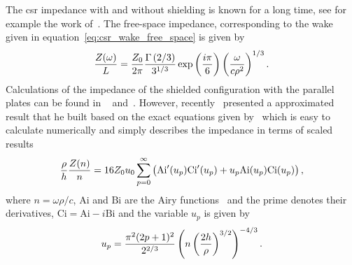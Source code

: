     The \gls{csr} impedance with and without shielding is known for a long time, see for example the work of~. The free-space impedance, corresponding to the wake given in equation~\eqref{eq:csr_wake_free_space} is given by~\cite[Eq. 18]{Nagaoka2014}
    \begin{align}\label{eq:csr_imp_free_space}
        \frac{Z(\omega)}{L} = \frac{Z_0}{2\pi}
                            \frac{\Gamma\left(2/3\right)}{3^{1/3}}
                            \exp\left(\frac{i\pi}{6}\right)
                            \left(\frac{\omega}{c\rho^2}\right)^{1/3}.
    \end{align}
    Calculations of the impedance of the shielded configuration with the parallel plates can be found in ~ and~. However, recently~ presented a approximated result that he built based on the exact equations given by~\citeauthor{Warnock1990} which is easy to calculate numerically and simply describes the impedance in terms of scaled results
    \def \Ai {\text{Ai}}
    \def \Bi {\text{Bi}}
    \def \Ci {\text{Ci}}
    \begin{align}\label{eq:csr_imp_shielding}
        \frac{\rho}{h} \frac{Z(n)}{n} = 16 Z_0 u_0
                        \sum_{p=0}^\infty \fof{\Ai'(u_p)\Ci'(u_p) +
                                            u_p\Ai(u_p)\Ci(u_p)},
    \end{align}
    where $n=\omega\rho/c$, $\Ai$ and $\Bi$ are the Airy functions~\cite{wiki2017c} and the prime denotes their derivatives, $\Ci = \Ai - i\Bi$ and the variable $u_p$ is given by
    \begin{align}
        u_p = \frac{\pi^2(2p+1)^2}{2^{2/3}}\left(n\left(\frac{2h}{\rho}\right)^{3/2}\right)^{-4/3}.
    \end{align}

